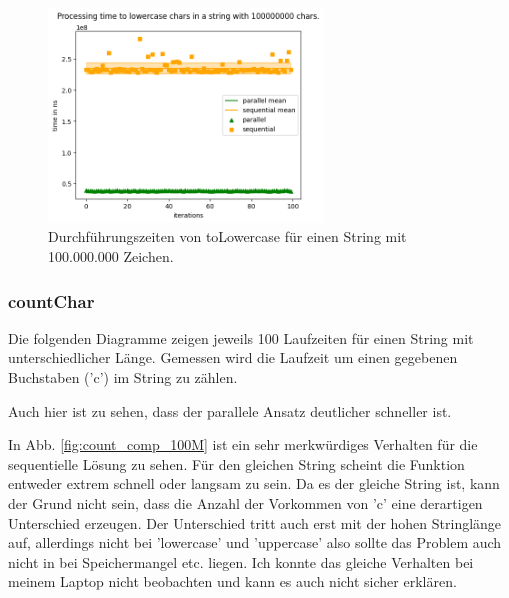 \documentclass[plainarticle,zihtitle,german,final,hyperref,utf8]{zihpub}
\begin{document}
\begin{figure}[h]
	\begin{center}
		\includegraphics[width=0.65\textwidth]{images/comp_lower_100000000.png}
		\caption{Durchführungszeiten von toLowercase für einen String mit 100.000.000 Zeichen.}
	\end{center}
\end{figure}

\clearpage
\subsubsection{countChar}
Die folgenden Diagramme zeigen jeweils 100 Laufzeiten für einen String mit unterschiedlicher Länge. Gemessen wird die Laufzeit um einen gegebenen Buchstaben ('c') im String zu zählen.

Auch hier ist zu sehen, dass der parallele Ansatz deutlicher schneller ist. 

In Abb. \ref{fig:count_comp_100M} ist ein sehr merkwürdiges Verhalten für die sequentielle Lösung zu sehen. Für den gleichen String scheint die Funktion entweder extrem schnell oder langsam zu sein. Da es der gleiche String ist, kann der Grund nicht sein, dass die Anzahl der Vorkommen von 'c' eine derartigen Unterschied erzeugen. Der Unterschied tritt auch erst mit der hohen Stringlänge auf, allerdings nicht bei 'lowercase' und 'uppercase' also sollte das Problem auch nicht in bei Speichermangel etc. liegen.
Ich konnte das gleiche Verhalten bei meinem Laptop nicht beobachten und kann es auch nicht sicher erklären.
\end{document}
